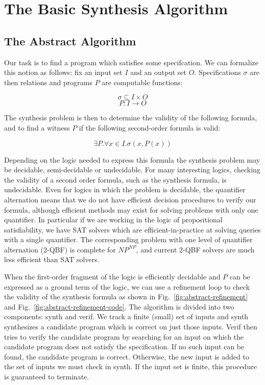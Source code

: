 \documentclass[a4paper]{llncs}
\begin{document}

\section{The Basic Synthesis Algorithm}
\label{sec:algorithm}

\subsection{The Abstract Algorithm}

Our task is to find a program which satisfies some specifcation.  We can formalize this
notion as follows: fix an input set $I$ and an output set $O$.  Specifications $\sigma$
are then relations and programs $P$ are computable functions:

$$ \sigma \subseteq I \times O $$
$$ P : I \rightarrow O$$

The synthesis problem is then to determine the validity of the following formula, and
to find a witness $P$ if the following second-order formula is valid:

$$\exists P . \forall x \in I . \sigma(x, P(x))$$

Depending on the logic needed to express this formula the synthesis problem may
be decidable, semi-decidable or undecidable.  For many interesting logics, checking
the validity of a second order formula, such as the synthesis formula, is undecidable.
Even for logics in which the problem is decidable, the quantifier alternation means that
we do not have efficient decision procedures to verify our formula, although efficient
methods may exist for solving problems with only one quantifier.  In particular
if we are working in the logic of propositional satisfiability, we have SAT solvers
which are efficient-in-practice at solving queries with a single quantifier.
The corresponding problem with one level of quantifier alternation (2-QBF) is
complete for $NP^{NP}$, and current 2-QBF solvers are much less efficient than SAT solvers.

When the first-order fragment of the logic is efficiently decidable and $P$ can be
expressed as a ground term of the logic, we can use a refinement loop to check the
validity of the synthesis formula as shown in Fig.~\ref{fig:abstract-refinement} and
Fig.~\ref{fig:abstract-refinement-code}.  The algorithm is divided into two
components: {\sc synth} and {\sc verif}.  We track a finite (small) set of inputs
and {\sc synth} synthesizes a candidate program which is correct on just those inputs.
{\sc Verif} then tries to verify the candidate program by searching for an input on
which the candidate program does not satisfy the specification.  If no such input
can be found, the candidate program is correct.  Otherwise, the new input is added
to the set of inputs we must check in {\sc synth}.  If the input set is finite, this
procedure is guaranteed to terminate.
\end{document}
